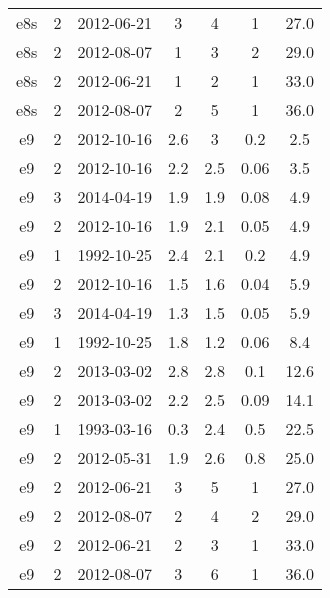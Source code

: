 \begin{longtable}{ccccccc}
e8s & 2 & 2012-06-21 & 3 & 4 & 1 & 27.0 \\
e8s & 2 & 2012-08-07 & 1 & 3 & 2 & 29.0 \\
e8s & 2 & 2012-06-21 & 1 & 2 & 1 & 33.0 \\
e8s & 2 & 2012-08-07 & 2 & 5 & 1 & 36.0 \\
e9 & 2 & 2012-10-16 & 2.6 & 3 & 0.2 & 2.5 \\
e9 & 2 & 2012-10-16 & 2.2 & 2.5 & 0.06 & 3.5 \\
e9 & 3 & 2014-04-19 & 1.9 & 1.9 & 0.08 & 4.9 \\
e9 & 2 & 2012-10-16 & 1.9 & 2.1 & 0.05 & 4.9 \\
e9 & 1 & 1992-10-25 & 2.4 & 2.1 & 0.2 & 4.9 \\
e9 & 2 & 2012-10-16 & 1.5 & 1.6 & 0.04 & 5.9 \\
e9 & 3 & 2014-04-19 & 1.3 & 1.5 & 0.05 & 5.9 \\
e9 & 1 & 1992-10-25 & 1.8 & 1.2 & 0.06 & 8.4 \\
e9 & 2 & 2013-03-02 & 2.8 & 2.8 & 0.1 & 12.6 \\
e9 & 2 & 2013-03-02 & 2.2 & 2.5 & 0.09 & 14.1 \\
e9 & 1 & 1993-03-16 & 0.3 & 2.4 & 0.5 & 22.5 \\
e9 & 2 & 2012-05-31 & 1.9 & 2.6 & 0.8 & 25.0 \\
e9 & 2 & 2012-06-21 & 3 & 5 & 1 & 27.0 \\
e9 & 2 & 2012-08-07 & 2 & 4 & 2 & 29.0 \\
e9 & 2 & 2012-06-21 & 2 & 3 & 1 & 33.0 \\
e9 & 2 & 2012-08-07 & 3 & 6 & 1 & 36.0 \\
\hline


\end{longtable}
